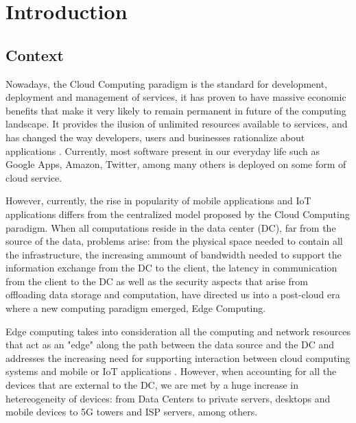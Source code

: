 \newcommand{\novathesis}{\emph{novathesis}}
\newcommand{\novathesisclass}{\texttt{novathesis.cls}}


\chapter{Introduction}
\label{cha:introduction}

\section{Context}

Nowadays, the Cloud Computing paradigm is the standard for development, deployment and management of services, 
it has proven to have massive economic benefits that make it very likely to remain permanent in future of the 
computing landscape. It provides the ilusion of unlimited resources available to services, and has changed the 
way developers, users and businesses rationalize about  applications \cite{10.1145/1721654.1721672}.
Currently, most software present in our everyday life such as Google Apps,
Amazon, Twitter, among many others is deployed on some form of cloud service. 

However, currently, the rise in popularity of mobile applications and IoT applications differs from 
the centralized model proposed by the Cloud Computing paradigm.
When all computations reside in the data center (DC), far from the source of the data, 
problems arise: from the physical space needed to contain all the infrastructure,
the increasing ammount of bandwidth needed to support the information exchange from the DC to the client,
the latency in communication from the client to the DC as well as the security aspects that arise from offloading data storage and computation,
have directed us into a post-cloud era where a new computing paradigm emerged, Edge Computing. 

Edge computing takes into consideration all the computing and network resources that act as an "edge" along
the path between the data source and the DC and addresses the increasing need for supporting interaction between cloud 
computing systems and mobile or IoT applications \cite{iot_journal_shi_weisong_and_cao}. However, 
when accounting for all the devices that are external to the DC, we are met by a huge increase in hetereogeneity of devices: 
from Data Centers to private servers, desktops and mobile devices to 5G towers and ISP servers, among others. 

